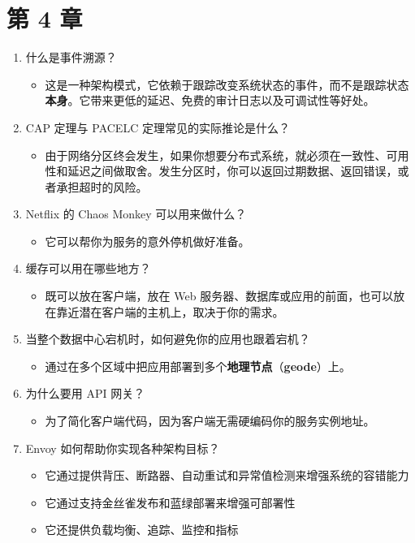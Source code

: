 \section*{第 4 章}

\begin{enumerate}
\item 什么是事件溯源？

\begin{itemize}
\item 这是一种架构模式，它依赖于跟踪改变系统状态的事件，而不是跟踪状态\textbf{本身}。它带来更低的延迟、免费的审计日志以及可调试性等好处。
\end{itemize}
\item CAP 定理与 PACELC 定理常见的实际推论是什么？

\begin{itemize}
\item 由于网络分区终会发生，如果你想要分布式系统，就必须在一致性、可用性和延迟之间做取舍。发生分区时，你可以返回过期数据、返回错误，或者承担超时的风险。
\end{itemize}
\item Netflix 的 Chaos Monkey 可以用来做什么？

\begin{itemize}
\item 它可以帮你为服务的意外停机做好准备。
\end{itemize}
\item 缓存可以用在哪些地方？

\begin{itemize}
\item 既可以放在客户端，放在 Web 服务器、数据库或应用的前面，也可以放在靠近潜在客户端的主机上，取决于你的需求。
\end{itemize}
\item 当整个数据中心宕机时，如何避免你的应用也跟着宕机？

\begin{itemize}
\item 通过在多个区域中把应用部署到多个\textbf{地理节点}（\textbf{geode}）上。
\end{itemize}
\item 为什么要用 API 网关？

\begin{itemize}
\item 为了简化客户端代码，因为客户端无需硬编码你的服务实例地址。
\end{itemize}
\item Envoy 如何帮助你实现各种架构目标？

\begin{itemize}
\item 它通过提供背压、断路器、自动重试和异常值检测来增强系统的容错能力
\item 它通过支持金丝雀发布和蓝绿部署来增强可部署性
\item 它还提供负载均衡、追踪、监控和指标
\end{itemize}
\end{enumerate}

